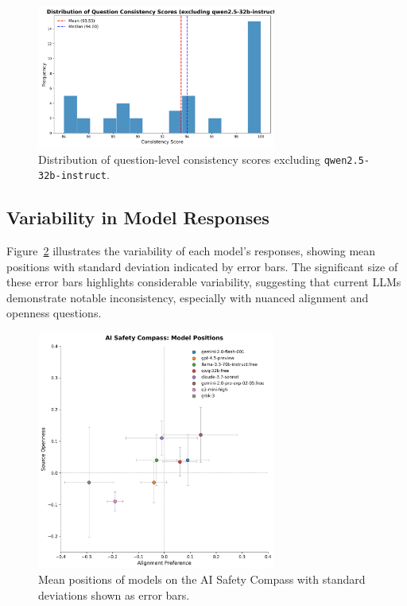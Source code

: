 \begin{figure}[htbp]
    \centering
    \includegraphics[width=0.7\textwidth]{figures/histogram_question_consistency_excluding_qwen2.5-32b-instruct.png}
    \caption{Distribution of question-level consistency scores excluding \texttt{qwen2.5-32b-instruct}.}
    \label{fig:question_consistency}
\end{figure}

\subsection{Variability in Model Responses}

Figure~\ref{fig:compass_variance} illustrates the variability of each model's responses, showing mean positions with standard deviation indicated by error bars. The significant size of these error bars highlights considerable variability, suggesting that current LLMs demonstrate notable inconsistency, especially with nuanced alignment and openness questions.

\begin{figure}[htbp]
    \centering
    \includegraphics[width=0.7\textwidth]{figures/compass_with_error_bars.png}
    \caption{Mean positions of models on the AI Safety Compass with standard deviations shown as error bars.}
    \label{fig:compass_variance}
\end{figure}

